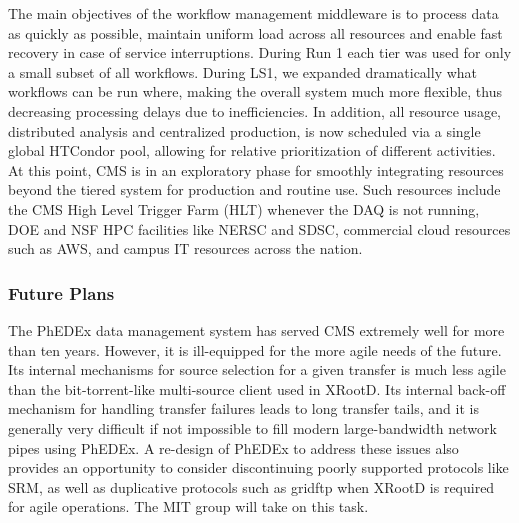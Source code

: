 \documentclass[11pt,a4paper]{article}
\begin{document}


The main objectives of the workflow management middleware is to
process data as quickly as possible, maintain uniform load across all
resources and enable fast recovery in case of service
interruptions.
During Run 1 each tier was used for only a small subset of all workflows.
During LS1, we expanded dramatically what workflows can be run where,
making the overall system much more flexible, thus decreasing processing delays due to inefficiencies. 
In addition, all resource
usage, distributed analysis and centralized production, is now scheduled
via a single global HTCondor pool, allowing for relative prioritization of
different activities.
At this point, CMS is in an exploratory phase for smoothly integrating resources beyond the tiered system
for production and routine use. Such resources include the CMS High Level Trigger Farm (HLT) whenever the DAQ is not running, 
DOE and NSF HPC facilities like NERSC and SDSC, commercial cloud resources such as AWS, and campus IT resources
across the nation.

\subsubsection{Future Plans}

The PhEDEx data management system has served CMS extremely well for more
than ten years.  However, it is ill-equipped for the more agile needs of
the future. Its internal mechanisms for source selection for a given
transfer is much less agile than the bit-torrent-like multi-source client
used in XRootD. Its internal back-off mechanism for handling transfer
failures leads to long transfer tails, and it is generally very difficult
if not impossible to fill modern large-bandwidth network pipes using
PhEDEx.  A re-design of PhEDEx to address these issues also provides an
opportunity to consider discontinuing poorly supported protocols like SRM,
as well as duplicative protocols such as gridftp when XRootD is required
for agile operations.  The MIT group will take
on this task.
\end{document}
